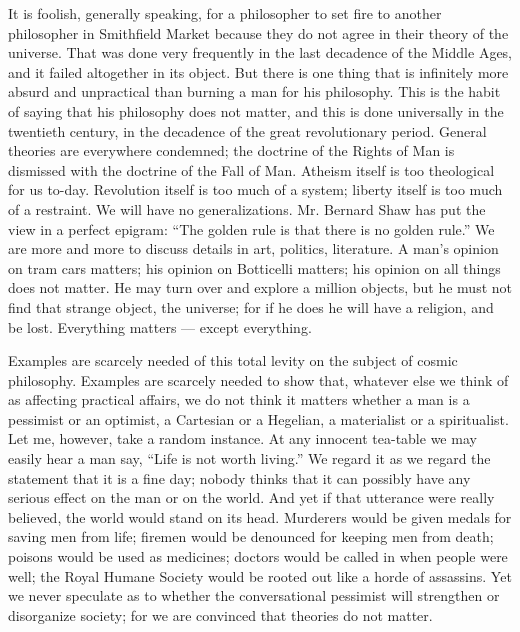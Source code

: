 It is foolish, generally speaking, for a philosopher to set fire to another philosopher in Smithfield Market because they do not agree in their theory of the universe. That was done very frequently in the last decadence of the Middle Ages, and it failed altogether in its object. But there is one thing that is infinitely more absurd and unpractical than burning a man for his philosophy. This is the habit of saying that his philosophy does not matter, and this is done universally in the twentieth century, in the decadence of the great revolutionary period. General theories are everywhere condemned; the doctrine of the Rights of Man is dismissed with the doctrine of the Fall of Man. Atheism itself is too theological for us to-day. Revolution itself is too much of a system; liberty itself is too much of a restraint. We will have no generalizations. Mr. Bernard Shaw has put the view in a perfect epigram: “The golden rule is that there is no golden rule.” We are more and more to discuss details in art, politics, literature. A man’s opinion on tram cars matters; his opinion on Botticelli matters; his opinion on all things does not matter. He may turn over and explore a million objects, but he must not find that strange object, the universe; for if he does he will have a religion, and be lost. Everything matters — except everything.

Examples are scarcely needed of this total levity on the subject of cosmic philosophy. Examples are scarcely needed to show that, whatever else we think of as affecting practical affairs, we do not think it matters whether a man is a pessimist or an optimist, a Cartesian or a Hegelian, a materialist or a spiritualist. Let me, however, take a random instance. At any innocent tea-table we may easily hear a man say, “Life is not worth living.” We regard it as we regard the statement that it is a fine day; nobody thinks that it can possibly have any serious effect on the man or on the world. And yet if that utterance were really believed, the world would stand on its head. Murderers would be given medals for saving men from life; firemen would be denounced for keeping men from death; poisons would be used as medicines; doctors would be called in when people were well; the Royal Humane Society would be rooted out like a horde of assassins. Yet we never speculate as to whether the conversational pessimist will strengthen or disorganize society; for we are convinced that theories do not matter.

